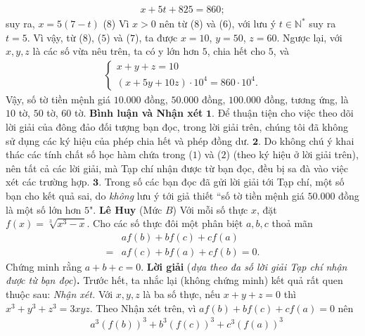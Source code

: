 \begin{multicols}{2}
\begin{align*}
		x + 5t + 825 = 860;
	\end{align*}
	suy ra,  $x = 5 (7-t)$ \hfill ($8$)
	\vskip 0.05cm
	Vì $x > 0$ nên từ ($8$) và ($6$), với lưu ý $t \in \mathbb{N^*}$  suy ra $t = 5$. Vì vậy, từ ($8$), ($5$) và ($7$), ta được $x = 10$, $y = 50$, $z = 60$.
	\vskip 0.05cm
	Ngược lại, với $x, y, z$ là các số vừa nêu trên, ta có y lớn hơn $5$, chia hết cho $5$, và
	\begin{align*}
		\begin{cases}
			x + y + z = 10\\[-0.5ex]
			(x + 5y + 10z) \cdot 10^4 = 860 \cdot 10^4.
		\end{cases}
	\end{align*}
	Vậy, số tờ tiền mệnh giá $10{.}000$ đồng, $50{.}000$ đồng, $100{.}000$ đồng, tương ứng, là $10$ tờ, $50$ tờ, $60$ tờ.
	\vskip 0.05cm
	\textbf{\color{thachthuctoanhoc}Bình luận và Nhận xét}
	\vskip 0.05cm	
	$\pmb{1.}$ Để thuận tiện cho việc theo dõi lời giải của đông đảo đối tượng bạn đọc, trong lời giải trên, chúng tôi đã không sử dụng các ký hiệu của phép chia hết và phép đồng dư.
	\vskip 0.05cm
	$\pmb{2.}$ Do không chú ý khai thác các tính chất số học hàm chứa trong ($1$) và ($2$) (theo ký hiệu ở lời giải trên), nên tất cả các lời giải, mà Tạp chí nhận được từ bạn đọc, đều bị sa đà vào việc xét các trường hợp.
	\vskip 0.05cm
	$\pmb{3.}$ Trong số các bạn đọc đã gửi lời giải tới Tạp chí, một số bạn cho kết quả sai, do \textit{không} lưu ý tới giả thiết ``số tờ tiền mệnh giá $50{.}000$ đồng là một số lớn hơn $5$".
	\vskip 0.05cm
	\hfill	\textbf{\color{thachthuctoanhoc}Lê Huy}
	\vskip 0.05cm
	{}
	(Mức $B$) Với mỗi số thực $x$, đặt $f(x)=\sqrt[3]{x^3-x}$. Cho các số thực đôi một phân biệt $a,b,c$ thoả mãn
	\begin{align*}
		&a f(b)+b f(c)+c f(a)\\[-0.5ex]
		=&a f(c)+b f(a)+c f(b)=0.
	\end{align*}
	Chứng minh rằng $a+b+c=0$. 
	\vskip 0.05cm
	\textbf{\color{thachthuctoanhoc}Lời giải} (\textit{dựa theo đa số lời giải Tạp chí nhận được từ bạn đọc})\textbf{\color{thachthuctoanhoc}.}
	\vskip 0.05cm
	Trước hết, ta nhắc lại (không chứng minh) kết quả rất quen thuộc sau:
	\vskip 0.05cm
	\textit{Nhận xét.} Với $x, y, z$ là ba số thực, nếu $x + y + z = 0$ thì ${x^3} + {y^3} + {z^3} = 3xyz.$   
	\vskip 0.05cm
	Theo Nhận xét trên, vì $af\left( b \right) + bf\left( c \right) + cf\left( a \right) = 0$  nên
	\begin{align*}
		&{a^3}{\left( {f\left( b \right)} \right)^3} + {b^3}{\left( {f\left( c \right)} \right)^3} + {c^3}{\left( {f\left( a \right)} \right)^3} \\[-0.5ex]

\end{align*}
\end{multicols}

